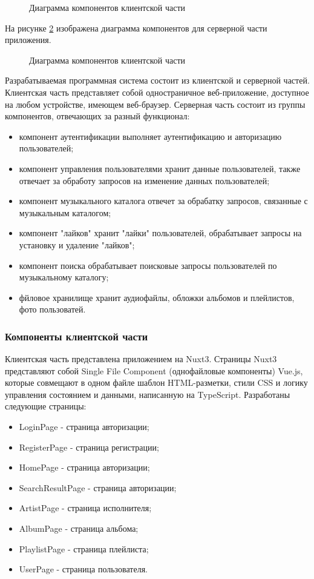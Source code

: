 \begin{figure}[ht]
\caption{Диаграмма компонентов клиентской части}
\label{frontendComponents:image}
\end{figure}

На рисунке \ref{backendComp:image} изображена диаграмма компонентов для серверной части приложения.

\begin{figure}[ht]
	\caption{Диаграмма компонентов клиентской части}
	\label{backendComp:image}
\end{figure}

Разрабатываемая программная система состоит из клиентской и серверной частей. Клиентская часть представляет собой одностраничное веб-приложение, доступное на любом устройстве, имеющем веб-браузер.
Серверная часть состоит из группы компонентов, отвечающих за разный функционал:
\begin{itemize}
	\item компонент аутентификации выполняет аутентификацию и авторизацию пользователей;
	\item компонент управления пользователями хранит данные пользователей, также отвечает за обработу запросов на изменение данных пользователей;
	\item компонент музыкального каталога отвечет за обрабатку запросов, связанные с музыкальным каталогом;
	\item компонент "лайков" хранит "лайки" пользователей, обрабатывает запросы на установку и удаление "лайков";
	\item компонент поиска обрабатывает поисковые запросы пользователей по музыкальному каталогу;
	\item фйловое хранилище хранит аудиофайлы, обложки альбомов и плейлистов, фото пользоватей.
\end{itemize}

\subsubsection{Компоненты клиентской части}

Клиентская часть представлена приложением на Nuxt3. Страницы Nuxt3 представляют собой Single File Component (однофайловые компоненты) Vue.js, которые совмещают в одном файле шаблон HTML-разметки, стили CSS и логику управления состоянием и данными, написанную на TypeScript.
Разработаны следующие страницы:
\begin{itemize}[]
	\item LoginPage - страница авторизации;
	\item RegisterPage - страница регистрации;
	\item HomePage - страница авторизации;
	\item SearchResultPage - страница авторизации;
	\item ArtistPage - страница исполнителя;
	\item AlbumPage - страница альбома;
	\item PlaylistPage - страница плейлиста;
	\item UserPage - страница пользователя.
\end{itemize}

